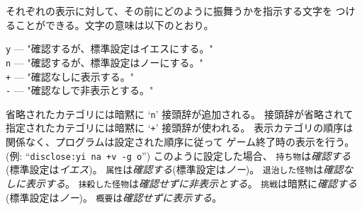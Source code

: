 それぞれの表示に対して、その前にどのように振舞うかを指示する文字を
つけることができる。文字の意味は以下のとおり。

{\tt y} --- "確認するが、標準設定はイエスにする。"\\
{\tt n} --- "確認するが、標準設定はノーにする。"\\
{\tt +} --- "確認なしに表示する。"\\
{\tt -} --- "確認なしで非表示とする。"

省略されたカテゴリには暗黙に `{\tt n}' 接頭辞が追加される。
接頭辞が省略されて指定されたカテゴリには暗黙に `{\tt +}' 接頭辞が使われる。
表示カテゴリの順序は関係なく、プログラムは設定された順序に従って
ゲーム終了時の表示を行う。
(例: ``{\tt disclose:yi na +v -g o}'')
このように設定した場合、
{\tt 持ち物}は{\it 確認する}(標準設定は{\it イエス})。
{\tt 属性}は{\it 確認する}(標準設定は{\it ノー})。
{\tt 退治した怪物}は{\it 確認なしに表示する}。
{\tt 抹殺した怪物}は{\it 確認せずに非表示とする}。
{\tt 挑戦}は暗黙に{\it 確認する}(標準設定は{\it ノー})。
{\tt 概要}は{\it 確認せずに表示する}。

